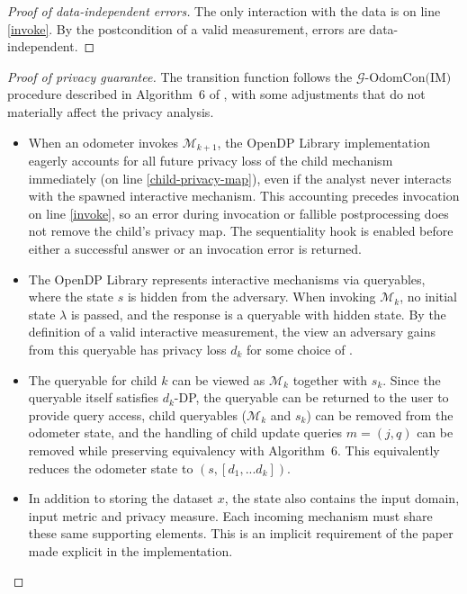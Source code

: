 \documentclass{article}
\begin{document}
\begin{proof}[Proof of data-independent errors]
    The only interaction with the data is on line \ref{invoke}.
    By the postcondition of a valid measurement,
    errors are data-independent.
\end{proof}

\begin{proof}[Proof of privacy guarantee]
    The transition function follows the $\mathcal{G}\text{-OdomCon(IM)}$ procedure described in Algorithm~6 of \cite{haney2023concurrentcompositioninteractivedifferential},
    with some adjustments that do not materially affect the privacy analysis.

    \begin{itemize}
        \item When an odometer invokes $\mathcal{M}_{k+1}$,
        the OpenDP Library implementation eagerly accounts for all future privacy loss of the child mechanism immediately (on line \ref{child-privacy-map}),
        even if the analyst never interacts with the spawned interactive mechanism.
        This accounting precedes invocation on line \ref{invoke},
        so an error during invocation or fallible postprocessing does not remove the child's privacy map.
        The sequentiality hook is enabled before either a successful answer or an invocation error is returned.
        \item The OpenDP Library represents interactive mechanisms via queryables,
        where the state $s$ is hidden from the adversary. When invoking $\mathcal{M}_k$,
        no initial state $\lambda$ is passed, and the response is a queryable with hidden state.
        By the definition of a valid interactive measurement, the view an adversary gains from this queryable has privacy loss $d_k$
        for some choice of \din.
        \item The queryable for child $k$ can be viewed as $\mathcal{M}_k$ together with $s_k$.
        Since the queryable itself satisfies $d_k$-DP, the queryable can be returned to the user to provide query access,
        child queryables ($\mathcal{M}_k$ and $s_k$) can be removed from the odometer state,
        and the handling of child update queries $m = (j, q)$ can be removed while preserving equivalency with Algorithm~6.
        This equivalently reduces the odometer state to $(s, [d_1, ... d_k])$.
        \item In addition to storing the dataset $x$,
        the state also contains the input domain, input metric and privacy measure.
        Each incoming mechanism must share these same supporting elements.
        This is an implicit requirement of the paper made explicit in the implementation.
    \end{itemize}


\end{proof}
\end{document}
